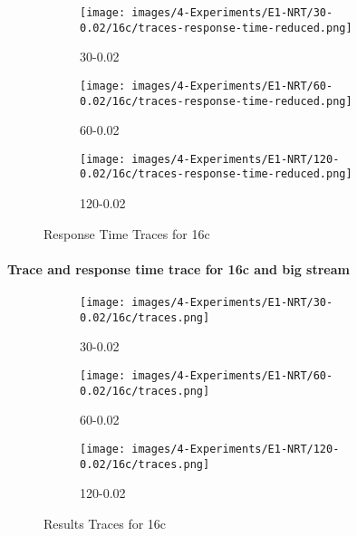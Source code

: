 \documentclass[12pt,a4paper]{article}
\begin{document}
\begin{figure}[H]
    \centering
    \begin{subfigure}[b]{\textwidth}
        \centering
        \texttt{[image: images/4-Experiments/E1-NRT/30-0.02/16c/traces-response-time-reduced.png]}
        \caption{30-0.02}
    \end{subfigure}
    
    \vspace{0.5cm} %
    \begin{subfigure}[b]{\textwidth}
        \centering
        \texttt{[image: images/4-Experiments/E1-NRT/60-0.02/16c/traces-response-time-reduced.png]}
        \caption{60-0.02}
    \end{subfigure}
    
    \vspace{0.5cm} %
    \begin{subfigure}[b]{\textwidth}
        \centering
        \texttt{[image: images/4-Experiments/E1-NRT/120-0.02/16c/traces-response-time-reduced.png]}
        \caption{120-0.02}
    \end{subfigure}

    \caption{Response Time Traces for 16c}
    \label{img:exps-small-responsetimetraces-16c}
\end{figure}

\paragraph{Trace and response time trace for 16c and big stream\\}

\begin{figure}[H]
    \centering
    \begin{subfigure}[b]{\textwidth}
        \centering
        \texttt{[image: images/4-Experiments/E1-NRT/30-0.02/16c/traces.png]}
        \caption{30-0.02}
    \end{subfigure}
    
    \vspace{0.5cm} %
    \begin{subfigure}[b]{\textwidth}
        \centering
        \texttt{[image: images/4-Experiments/E1-NRT/60-0.02/16c/traces.png]}
        \caption{60-0.02}
    \end{subfigure}
    
    \vspace{0.5cm} %
    \begin{subfigure}[b]{\textwidth}
        \centering
        \texttt{[image: images/4-Experiments/E1-NRT/120-0.02/16c/traces.png]}
        \caption{120-0.02}
    \end{subfigure}

    \caption{Results Traces for 16c}
    \label{img:exps-small-traces-16c}
\end{figure}
\end{document}
